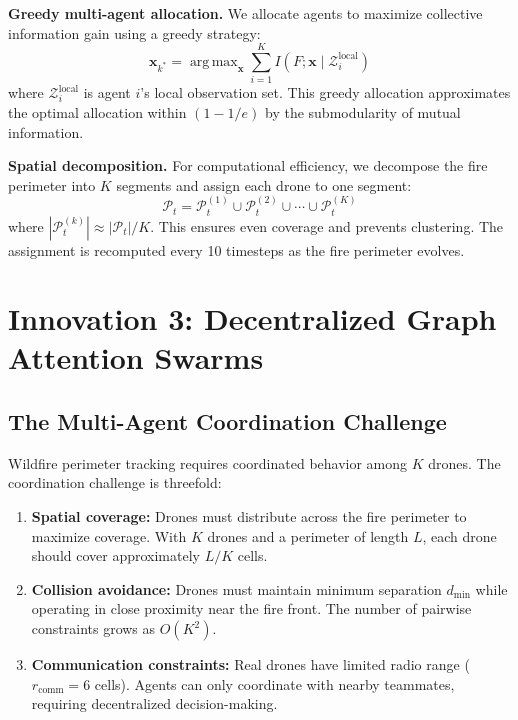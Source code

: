 \documentclass[12pt,a4paper]{article}
\DeclareRobustCommand{\cP}{\mathcal{P}}
\DeclareRobustCommand{\cZ}{\mathcal{Z}}
\DeclareRobustCommand{\vect}[1]{\bm{#1}}
\DeclareMathOperator*{\argmax}{arg\,max}
\begin{document}
\textbf{Greedy multi-agent allocation.} We allocate agents to maximize collective information gain using a greedy strategy:
\begin{equation}
    \vect{x}_{k^*} = \argmax_{\vect{x}} \sum_{i=1}^{K} I(F; \vect{x} \mid \cZ_i^{\text{local}})
\end{equation}
where $\cZ_i^{\text{local}}$ is agent $i$'s local observation set. This greedy allocation approximates the optimal allocation within $(1-1/e)$ by the submodularity of mutual information.

\textbf{Spatial decomposition.} For computational efficiency, we decompose the fire perimeter into $K$ segments and assign each drone to one segment:
\begin{equation}
    \cP_t = \cP_t^{(1)} \cup \cP_t^{(2)} \cup \cdots \cup \cP_t^{(K)}
\end{equation}
where $|\cP_t^{(k)}| \approx |\cP_t| / K$. This ensures even coverage and prevents clustering. The assignment is recomputed every 10 timesteps as the fire perimeter evolves.


\section{Innovation 3: Decentralized Graph Attention Swarms}
\label{sec:gat_swarms}

\subsection{The Multi-Agent Coordination Challenge}

Wildfire perimeter tracking requires coordinated behavior among $K$ drones. The coordination challenge is threefold:

\begin{enumerate}[leftmargin=*]
    \item \textbf{Spatial coverage:} Drones must distribute across the fire perimeter to maximize coverage. With $K$ drones and a perimeter of length $L$, each drone should cover approximately $L/K$ cells.
    \item \textbf{Collision avoidance:} Drones must maintain minimum separation $d_{\min}$ while operating in close proximity near the fire front. The number of pairwise constraints grows as $O(K^2)$.
    \item \textbf{Communication constraints:} Real drones have limited radio range ($r_{\text{comm}} = 6$ cells). Agents can only coordinate with nearby teammates, requiring decentralized decision-making.
\end{enumerate}
\end{document}
